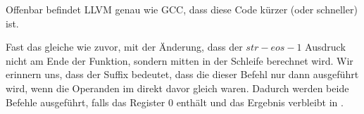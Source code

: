 Offenbar befindet LLVM genau wie GCC, dass diese Code kürzer (oder schneller)
ist.

\mysubparagraph{\OptimizingKeilVI (\ARMMode)}




Fast das gleiche wie zuvor, mit der Änderung, dass der $str - eos - 1$
Ausdruck nicht am Ende der Funktion, sondern mitten in der Schleife berechnet
wird. Wir erinnern uns, dass der  Suffix bedeutet, dass die dieser
Befehl nur dann ausgeführt wird, wenn die Operanden im \CMP direkt davor gleich
waren.
Dadurch werden beide  Befehle ausgeführt, falls das  Register 0
enthält und das Ergebnis verbleibt in .